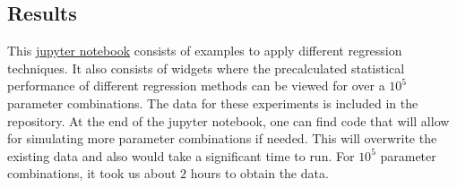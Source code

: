 \subsection{Results} \label{subsec:results_linear_regression}

This \href{https://github.com/am-kaiser/CompSci-Project-1/blob/main/regression_analysis/examples/linear_regression_analysis.ipynb}{jupyter notebook} consists of examples to apply different regression techniques. It also consists of widgets where the precalculated statistical performance of different regression methods can be viewed for over a $10^5$ parameter combinations. The data for these experiments is included in the repository. At the end of the jupyter notebook, one can find code that will allow for simulating more parameter combinations if needed. This will overwrite the existing data and also would take a significant time to run. For $10^5$ parameter combinations, it took us about $2$ hours to obtain the data.

